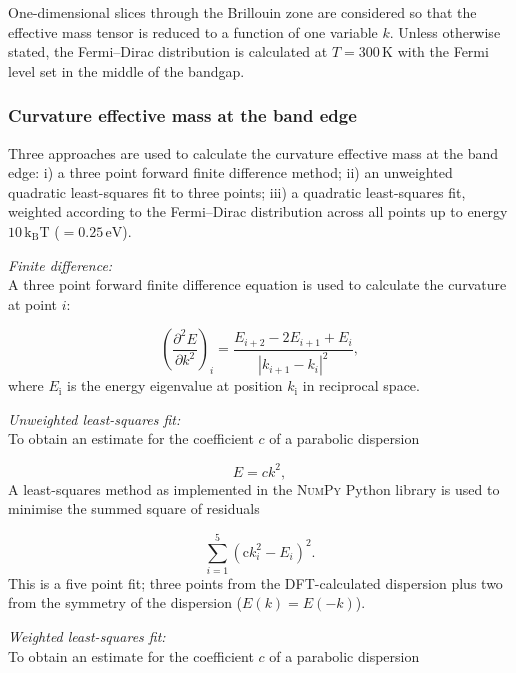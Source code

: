 One-dimensional slices through the Brillouin zone are considered so that the effective mass tensor is reduced to a function of one variable $k$. Unless otherwise stated, the Fermi--Dirac distribution is calculated at $T=300\,\mathrm{K}$ with the Fermi level set in the middle of the bandgap.

\subsubsection{Curvature effective mass at the band edge}

Three approaches are used to calculate the curvature effective mass at the band edge: i) a three point forward finite difference method; ii) an unweighted quadratic least-squares fit\autocite{Vanderwalt2011} to three points; iii) a quadratic least-squares fit, weighted according to the Fermi--Dirac distribution across all points up to energy $10\,\mathrm{k_\mathrm{B}T}$ ($=0.25\,\mathrm{eV}$).

\textit{Finite difference:} \\
A three point forward finite difference equation is used to calculate the curvature at point $i$:\autocite{finitedifferencewebpage}

\begin{equation}
\left(\frac{\partial^2E}{\partial k^2}\right)_i = \frac{E_{i+2} - 2E_{i+1} + E_i}{\left|k_{i+1} - k_i\right|^2},
\end{equation}
where $E_\mathrm{i}$ is the energy eigenvalue at position $k_\mathrm{i}$ in reciprocal space. 

\textit{Unweighted least-squares fit:}\\
To obtain an estimate for the coefficient $c$ of a parabolic dispersion

\begin{equation}
E = {c}k^2,
\end{equation}
A least-squares method as implemented in the \textsc{NumPy} Python library is used to minimise the summed square of residuals

\begin{equation}
\sum^{5}_{i=1}(\mathrm{c}k_{i}^2 - E_{i})^2.
\end{equation}
This is a five point fit; three points from the DFT-calculated dispersion plus two from the symmetry of the dispersion ($E(k)=E(-k)$).

\textit{Weighted least-squares fit:}\\
To obtain an estimate for the coefficient $c$ of a parabolic dispersion

